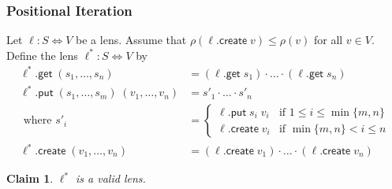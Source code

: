 \documentclass[acmsmall,review,anonymous]{acmart}\settopmatter{printfolios=true,printccs=false,printacmref=false}
\newtheorem{claim}{Claim}
\newcommand{\kw}[1]{\ensuremath{\mathsf{#1}}}
\newcommand{\get}{\ensuremath{\kw{get}}}
\newcommand{\pput}{\ensuremath{\kw{put}}}
\newcommand{\create}{\ensuremath{\kw{create}}}
\begin{document}
\subsubsection{Positional Iteration}
Let $\ell: S \Leftrightarrow V$ be a lens. Assume that $\rho(\ell.\create \;
v) \leq \rho(v)$ for all $v \in V$. Define the lens $\ell^*:
S \Leftrightarrow V$ by
\begin{align*}
\ell^* .\get \; (s_1, \ldots, s_n) &= (\ell.\get \; s_1) \cdot \ldots \cdot
(\ell.\get \; s_n)\\
\ell^* .\pput \; (s_1, \ldots, s_m) \; (v_1, \ldots, v_n) &= s'_1 \cdot \ldots
\cdot s'_n\\
\text{ where } s'_i &= \begin{cases}
\ell.\pput \; s_i \; v_i & \text{if } 1 \leq i \leq \min\{m, n\}\\
\ell.\create \; v_i & \text{if } \min\{m, n\} < i \leq n
\end{cases}\\
\ell^*.\create \; (v_1, \ldots, v_n) &= (\ell.\create \; v_1) \cdot \ldots \cdot
(\ell.\create \; v_n)
\end{align*}
\begin{claim}
$\ell^*$ is a valid lens.
\end{claim}
\end{document}

